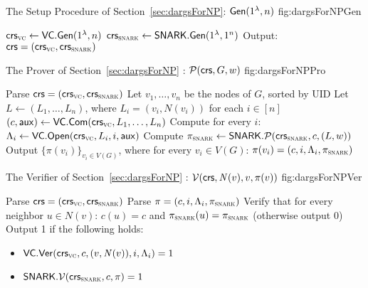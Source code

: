 \begin{subfigures}\label{fig:dargsForNP}
    \begin{nicefig}[h]{The Setup Procedure of Section~\ref{sec:dargsForNP}: $\mathsf{Gen}(1^\lambda, n)$ }{fig:dargsForNPGen}
        \begin{algorithmic}[1]
            \State $\mathsf{crs}_\textsc{vc} \leftarrow \mathsf{VC}.\mathsf{Gen}(1^\lambda, n)$
            \State $\mathsf{crs}_\textsc{snark} \leftarrow \mathsf{SNARK}.\mathsf{Gen}(1^\lambda, 1^n)$
            \State Output: $\mathsf{crs} = (\mathsf{crs}_\textsc{vc}, \mathsf{crs}_\textsc{snark})$
        \end{algorithmic}
    \end{nicefig}
    
    \begin{nicefig}[h]{The Prover of Section~\ref{sec:dargsForNP} : $\mathcal{P}(\mathsf{crs}, G, w)$ }{fig:dargsForNPPro}
        \begin{algorithmic}[1]
            \State Parse $\mathsf{crs}=(\mathsf{crs}_\textsc{vc}, \mathsf{crs}_\textsc{snark})$
	    \State Let $v_1,\ldots,v_n$ be the nodes of $G$, sorted by UID
	    \State Let $L \leftarrow (L_1,\ldots,L_n)$,
	    where $L_i = ( v_i, N(v_i))$ for each $i \in [n]$
            \State $(c,\mathsf{aux}) \leftarrow \mathsf{VC}.\mathsf{Com}(\mathsf{crs}_\textsc{vc}, L_1,\ldots, L_n)$
            \State Compute for every $i$: $\Lambda_i \leftarrow \mathsf{VC}.\mathsf{Open}(\mathsf{crs}_\textsc{vc}, L_i, i, \mathsf{aux})$
            \State Compute $\pi_\textsc{snark} \leftarrow \mathsf{SNARK}.\mathcal{P}(\mathsf{crs}_\textsc{snark}, c, (L, w))$
            \State Output $\{\pi(v_i)\}_{v_i\in V(G)}$, where for every $v_i\in V(G)$: $\pi(v_i) = (c, i, \Lambda_{i}, \pi_\textsc{snark})$
        \end{algorithmic}
    \end{nicefig}

    \begin{nicefig}[h]{The Verifier of Section~\ref{sec:dargsForNP} : $\mathcal{V}(\mathsf{crs}, \mathit{ N }(v), v, \pi(v))$ }{fig:dargsForNPVer}
        \begin{algorithmic}[1]
            \State Parse $\mathsf{crs}=(\mathsf{crs}_\textsc{vc}, \mathsf{crs}_\textsc{snark})$
            \State Parse $\pi = (c, i, \Lambda_i, \pi_\textsc{snark})$
            \State Verify that for every neighbor $u \in N(v)$:
	    $c(u) = c$ and $\pi_\textsc{snark}(u) = \pi_\textsc{snark}$ (otherwise output 0)\label{step:verifyCom}
            \State Output 1 if the following holds:
            \begin{itemize}
                \item $\mathsf{VC}.\mathsf{Ver}(\mathsf{crs}_\textsc{vc}, c, (v,\mathit{ N }(v)), i, \Lambda_i) = 1$
                \item $\mathsf{SNARK}.\mathcal{V}(\mathsf{crs}_\textsc{snark}, c, \pi) = 1$
            \end{itemize}
        \end{algorithmic}
    \end{nicefig}
\end{subfigures}




